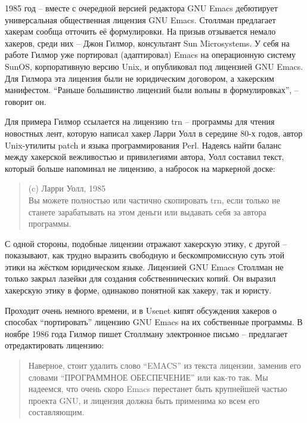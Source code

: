 1985 год -- вместе с очередной версией редактора GNU Emacs дебютирует универсальная общественная лицензия GNU Emacs. Столлман предлагает хакерам сообща отточить её формулировки. На призыв отзывается немало хакеров, среди них -- Джон Гилмор, консультант Sun Microsystems. У себя на работе Гилмор уже портировал (адаптировал) Emacs на операционную систему SunOS, корпоративную версию Unix, и опубликовал под лицензией GNU Emacs. Для Гилмора эта лицензия были не юридическим договором, а хакерским манифестом. ``Раньше большинство лицензий были вольны в формулировках'', -- говорит он.

Для примера Гилмор ссылается на лицензию trn -- программы для чтения новостных лент, которую написал хакер Ларри Уолл в середине 80-х годов, автор Unix-утилиты patch и языка программирования Perl. Надеясь найти баланс между хакерской вежливостью и привилегиями автора, Уолл составил текст, который больше напоминал не лицензию, а набросок на маркерной доске:

\begin{quote}
(c) Ларри Уолл, 1985\\
Вы можете полностью или частично скопировать trn, если только не станете зарабатывать на этом деньги или выдавать себя за автора программы.
\end{quote}

С одной стороны, подобные лицензии отражают хакерскую этику, с другой -- показывают, как трудно выразить свободную и бескомпромиссную суть этой этики на жёстком юридическом языке. Лицензией GNU Emacs Столлман не только закрыл лазейки для создания собственнических копий. Он выразил хакерскую этику в форме, одинаково понятной как хакеру, так и юристу.

Проходит очень немного времени, и в Usenet кипят обсуждения хакеров о способах ``портировать'' лицензию GNU Emacs на их собственные программы. В ноябре 1986 года Гилмор пишет Столлману электронное письмо -- предлагает отредактировать лицензию:

\begin{quote}
Наверное, стоит удалить слово ``EMACS'' из текста лицензии, заменив его словами ``ПРОГРАММНОЕ ОБЕСПЕЧЕНИЕ'' или как-то так. Мы надеемся, что очень скоро Emacs перестанет быть крупнейшей частью проекта GNU, и лицензия должна быть применима ко всем его составляющим.
\end{quote}

